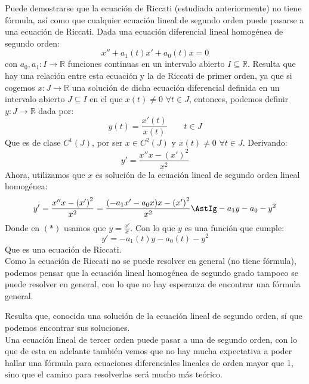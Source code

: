 Puede demostrarse que la ecuación de Riccati (estudiada anteriormente) no tiene fórmula, así como que cualquier ecuación lineal de segundo orden puede pasarse a una ecuación de Riccati. Dada una ecuación diferencial lineal homogénea de segundo orden:
\begin{equation*}
    x'' + a_1(t) x' + a_0(t) x = 0
\end{equation*}
con $a_0,a_1:I\rightarrow\mathbb{R}$ funciones continuas en un intervalo abierto $I\subseteq \mathbb{R}$. Resulta que hay una relación entre esta ecuación y la de Riccati de primer orden, ya que si cogemos $x:J\rightarrow\mathbb{R}$ una solución de dicha ecuación diferencial definida en un intervalo abierto $J\subseteq I$ en el que $x(t) \neq 0$ $\forall t\in J$, entonces, podemos definir $y:J\rightarrow\mathbb{R}$ dada por:
\begin{equation*}
    y(t) = \dfrac{x'(t)}{x(t)} \qquad t\in J
\end{equation*}
Que es de clase $C^1(J)$, por ser $x\in C^2(J)$ y $x(t) \neq 0$ $\forall t\in J$. Derivando:
\begin{equation*}
    y' = \dfrac{x'' x - {(x')}^{2}}{x^2}
\end{equation*}
Ahora, utilizamos que $x$ es solución de la ecuación lineal de segundo orden lineal homogénea:
\begin{equation*}
    y' = \dfrac{x'' x - {(x')}^{2}}{x^2} = \dfrac{(-a_1x' - a_0 x)x - {(x')}^{2}}{x^2} \AstIg -a_1 y - a_0 -y^2
\end{equation*}
Donde en $(\ast)$ usamos que $y = \frac{x'}{x}$. Con lo que $y$ es una función que cumple:
\begin{equation*}
    y' = -a_1(t)y - a_0(t) - y^2
\end{equation*}
Que es una ecuación de Riccati.\\

Como la ecuación de Riccati no se puede resolver en general (no tiene fórmula), podemos pensar que la ecuación lineal homogénea de segundo grado tampoco se puede resolver en general, con lo que no hay esperanza de encontrar una fórmula general.

Resulta que, conocida una solución de la ecuación lineal de segundo orden, sí que podemos encontrar sus soluciones.\\

Una ecuación lineal de tercer orden puede pasar a una de segundo orden, con lo que de esta en adelante también vemos que no hay mucha expectativa a poder hallar una fórmula para ecuaciones diferenciales lineales de orden mayor que 1, sino que el camino para resolverlas será mucho más teórico.\\

